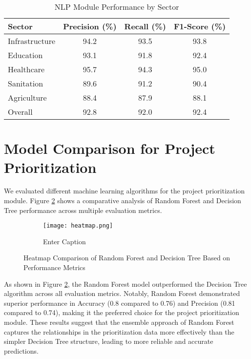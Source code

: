 \documentclass[12pt,a4paper]{report}
\begin{document}
\begin{table}[h]
\centering
\caption{NLP Module Performance by Sector}
\label{tab:nlp_performance}
\begin{tabular}{lccc}
\toprule
\textbf{Sector} & \textbf{Precision (\%)} & \textbf{Recall (\%)} & \textbf{F1-Score (\%)} \\
\midrule
Infrastructure & 94.2 & 93.5 & 93.8 \\
Education & 93.1 & 91.8 & 92.4 \\
Healthcare & 95.7 & 94.3 & 95.0 \\
Sanitation & 89.6 & 91.2 & 90.4 \\
Agriculture & 88.4 & 87.9 & 88.1 \\
\midrule
Overall & 92.8 & 92.0 & 92.4 \\
\bottomrule
\end{tabular}
\end{table}

\section{Model Comparison for Project Prioritization}
\indent \indent We evaluated different machine learning algorithms for the project prioritization module. Figure \ref{fig:model_comparison} shows a comparative analysis of Random Forest and Decision Tree performance across multiple evaluation metrics.

\begin{figure}[H]
    \centering
    \begin{figure}
        \centering
        \texttt{[image: heatmap.png]}
        \caption{Enter Caption}
        \label{fig:enter-label}
    \end{figure}
    \caption{Heatmap Comparison of Random Forest and Decision Tree Based on Performance Metrics}
    \label{fig:model_comparison}
\end{figure}

\noindent As shown in Figure \ref{fig:model_comparison}, the Random Forest model outperformed the Decision Tree algorithm across all evaluation metrics. Notably, Random Forest demonstrated superior performance in Accuracy (0.8 compared to 0.76) and Precision (0.81 compared to 0.74), making it the preferred choice for the project prioritization module. These results suggest that the ensemble approach of Random Forest captures the relationships in the prioritization data more effectively than the simpler Decision Tree structure, leading to more reliable and accurate predictions.
\end{document}
